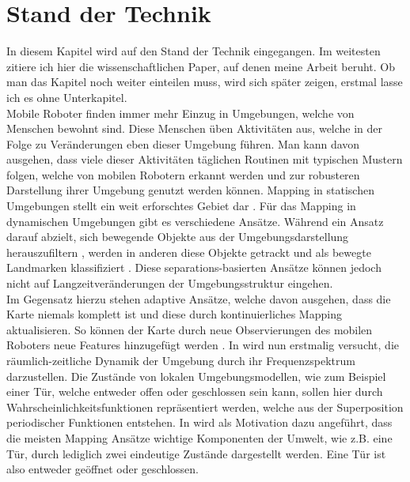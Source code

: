 \chapter{Stand der Technik}
In diesem Kapitel wird auf den Stand der Technik eingegangen. Im weitesten zitiere ich hier die wissenschaftlichen Paper, auf denen meine Arbeit beruht. Ob man das Kapitel noch weiter einteilen muss, wird sich später zeigen, erstmal lasse ich es ohne Unterkapitel. \\
Mobile Roboter finden immer mehr Einzug in Umgebungen, welche von Menschen bewohnt sind. Diese Menschen üben Aktivitäten aus, welche in der Folge zu Veränderungen eben dieser Umgebung führen. Man kann davon ausgehen, dass viele dieser Aktivitäten täglichen Routinen mit typischen Mustern folgen, welche von mobilen Robotern erkannt werden und zur robusteren Darstellung ihrer Umgebung genutzt werden können. Mapping in statischen Umgebungen stellt ein weit erforschtes Gebiet dar \cite{Eichler.2006}. Für das Mapping in dynamischen Umgebungen gibt es verschiedene Ansätze. Während ein Ansatz darauf abzielt, sich bewegende Objekte aus der Umgebungsdarstellung herauszufiltern \cite{Hahnel.30Sept.5Oct.2002}, werden in anderen diese Objekte getrackt und als bewegte Landmarken klassifiziert \cite{Montesano.2008}. Diese separations-basierten Ansätze können jedoch nicht auf Langzeitveränderungen der Umgebungsstruktur eingehen. \\
Im Gegensatz hierzu stehen adaptive Ansätze, welche davon ausgehen, dass die Karte niemals komplett ist und diese durch kontinuierliches Mapping aktualisieren. So können der Karte durch neue Observierungen des mobilen Roboters neue Features hinzugefügt werden 
\cite{Milford.2010}. In \cite{Krajnik.2014} wird nun erstmalig versucht, die räumlich-zeitliche Dynamik der Umgebung durch ihr Frequenzspektrum darzustellen. Die Zustände von lokalen Umgebungsmodellen, wie zum Beispiel einer Tür, welche entweder offen oder geschlossen sein kann, sollen hier durch Wahrscheinlichkeitsfunktionen repräsentiert werden, welche aus der Superposition periodischer Funktionen entstehen. In \cite{Krajnik.2014} wird als Motivation dazu angeführt, dass die meisten Mapping Ansätze wichtige Komponenten der Umwelt, wie z.B. eine Tür, durch lediglich zwei eindeutige Zustände dargestellt werden. Eine Tür ist also entweder geöffnet oder geschlossen. %

